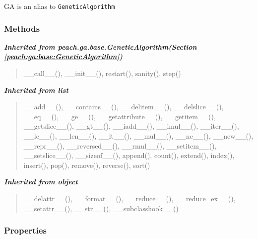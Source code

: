GA is an alias to \texttt{GeneticAlgorithm}


  \subsubsection{Methods}


\large{\textbf{\textit{Inherited from peach.ga.base.GeneticAlgorithm\textit{(Section \ref{peach:ga:base:GeneticAlgorithm})}}}}

\begin{quote}
\_\_call\_\_(), \_\_init\_\_(), restart(), sanity(), step()
\end{quote}

\large{\textbf{\textit{Inherited from list}}}

\begin{quote}
\_\_add\_\_(), \_\_contains\_\_(), \_\_delitem\_\_(), \_\_delslice\_\_(), \_\_eq\_\_(), \_\_ge\_\_(), \_\_getattribute\_\_(), \_\_getitem\_\_(), \_\_getslice\_\_(), \_\_gt\_\_(), \_\_iadd\_\_(), \_\_imul\_\_(), \_\_iter\_\_(), \_\_le\_\_(), \_\_len\_\_(), \_\_lt\_\_(), \_\_mul\_\_(), \_\_ne\_\_(), \_\_new\_\_(), \_\_repr\_\_(), \_\_reversed\_\_(), \_\_rmul\_\_(), \_\_setitem\_\_(), \_\_setslice\_\_(), \_\_sizeof\_\_(), append(), count(), extend(), index(), insert(), pop(), remove(), reverse(), sort()
\end{quote}

\large{\textbf{\textit{Inherited from object}}}

\begin{quote}
\_\_delattr\_\_(), \_\_format\_\_(), \_\_reduce\_\_(), \_\_reduce\_ex\_\_(), \_\_setattr\_\_(), \_\_str\_\_(), \_\_subclasshook\_\_()
\end{quote}


  \subsubsection{Properties}

